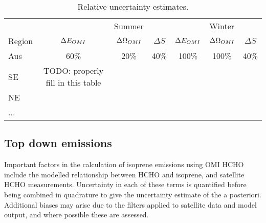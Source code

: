   \begin{table}\begin{threeparttable}
      \caption{Relative uncertainty estimates.}
      \begin{tabular}{ l | c  c  c | c c c} 
        \toprule
        & & Summer & & & Winter & \\
        Region & $\Delta E_{OMI}$ & $\Delta \Omega_{OMI}$ & $\Delta S$ 
          & $\Delta E_{OMI}$ & $\Delta \Omega_{OMI}$ & $\Delta S$ \\
         
        \midrule
          Aus & 60\% &  20\% &  40\%  & 100\% & 100\% &  40\%  \\
          SE & TODO: properly fill in this table & & & & & \\
          NE & & & & & & \\
          ... & & & & & & \\
        \bottomrule
      \end{tabular}
      \label{BioIsop:uncertainty:tab_uncertainties}
    \end{threeparttable}\end{table}
    
    
    
  \subsection{Top down emissions}
    \label{BioIsop:uncertainty:eomi}
    
    Important factors in the calculation of isoprene emissions using OMI HCHO include the modelled relationship between HCHO and isoprene, and satellite HCHO measurements.
    Uncertainty in each of these terms is quantified before being combined in quadrature to give the uncertainty estimate of the a posteriori.
    Additional biases may arise due to the filters applied to satellite data and model output, and where possible these are assessed. 
    
